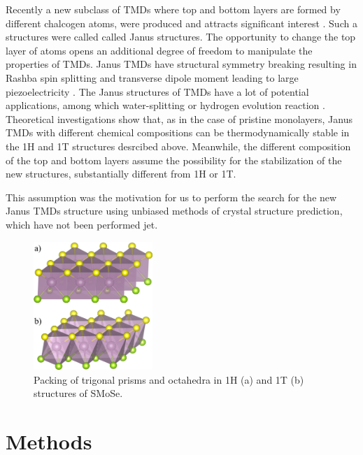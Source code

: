 \documentclass[a4paperm]{article}
\begin{document}
Recently a new subclass of TMDs where top and bottom layers are formed by different chalcogen atoms, were produced and attracts significant interest \cite{lu2017, zhang2017janus}. 
Such a structures were called called Janus structures.
The opportunity to change the top layer of atoms opens an additional degree of freedom to manipulate the properties of TMDs. 
Janus TMDs have structural symmetry breaking \cite{li2017electronic, van2020first} resulting in Rashba spin splitting \cite{hu2018intrinsic} and transverse dipole moment leading to large piezoelectricity \cite{dong2017large, li2018recent}. 
The Janus structures of TMDs have a lot of potential applications, among which water-splitting \cite{xia2018universality, ma2018janus} or hydrogen evolution reaction \cite{er2018prediction, zhou2019janus}. 
Theoretical investigations show that, as in the case of pristine monolayers, Janus TMDs with different chemical compositions can be thermodynamically stable in the 1H and 1T structures desrcibed above.
Meanwhile, the different composition of the top and bottom layers assume the possibility for the stabilization of the new structures, substantially different from 1H or 1T.

This assumption was the motivation for us to perform the search for the new Janus TMDs structure using unbiased methods of crystal structure prediction, which have not been performed jet.




\begin{figure}[H]
        \includegraphics[width=0.4\textwidth]{1H1T.png}
        \caption{Packing of trigonal prisms and octahedra in 1H (a) and 1T (b) structures of SMoSe.}
\label{1H1T}
\end{figure}





		\section{Methods}
\end{document}
